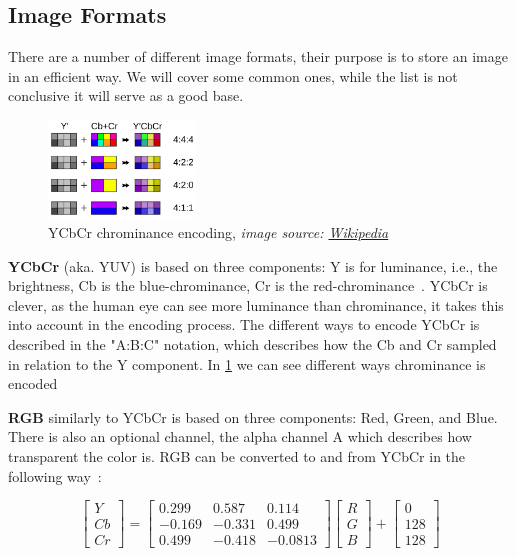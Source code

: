 \subsection{Image Formats} \label{section:imageformats}
There are a number of different image formats, their purpose is to store an
image in an efficient way. We will cover some common ones, while the list is
not conclusive it will serve as a good base.

\begin{figure}
  \centering
  \includegraphics[width=0.35\textwidth]{figures/ycbcr.png}
  \caption{YCbCr chrominance encoding, \textit{image source: \href{https://en.wikipedia.org/wiki/Chroma_subsampling}{Wikipedia}}}
  \label{fig:ycbcr}
\end{figure}
\textbf{YCbCr} (aka. YUV) is based on three components: Y is for luminance, i.e., the
brightness, Cb is the blue-chrominance, Cr is the
red-chrominance~\cite{safir2022rgb}. YCbCr is clever, as the human eye can see
more luminance than chrominance, it takes this into account in the
encoding process. The different ways to encode YCbCr is described in the
"A:B:C" notation, which describes how the Cb and Cr sampled in relation to the
Y component. In \cref{fig:ycbcr} we can see different ways chrominance is
encoded

\pagebreak
\textbf{RGB} similarly to YCbCr is based on three components: Red, Green, and
Blue. There is also an optional channel, the alpha channel A which describes
how transparent the color is. RGB can be converted to and from YCbCr in the
following way~\cite{yang2007ycbcr}:

\[
\begin{bmatrix}
Y \\
Cb \\
Cr
\end{bmatrix}
=
\begin{bmatrix}
0.299 & 0.587 & 0.114 \\
-0.169 & -0.331 & 0.499 \\
0.499 & -0.418 & -0.0813
\end{bmatrix}
\begin{bmatrix}
R \\
G \\
B
\end{bmatrix}
+
\begin{bmatrix}
0 \\
128 \\
128
\end{bmatrix}
\]

